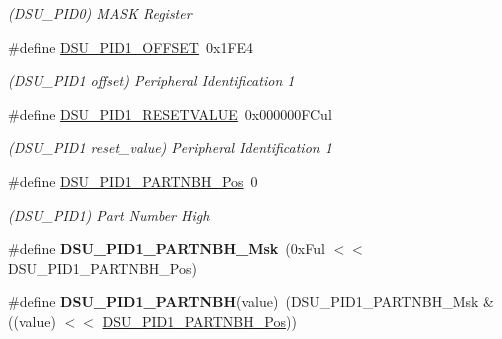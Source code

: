 \begin{DoxyCompactItemize}
\begin{DoxyCompactList}\small\item\em (D\+S\+U\+\_\+\+P\+I\+D0) M\+A\+S\+K Register \end{DoxyCompactList}\item 
\hypertarget{group___s_a_m_l21___d_s_u_ga1114e2adaab2fe61ed027acf899418de}{}\#define \hyperlink{group___s_a_m_l21___d_s_u_ga1114e2adaab2fe61ed027acf899418de}{D\+S\+U\+\_\+\+P\+I\+D1\+\_\+\+O\+F\+F\+S\+E\+T}~0x1\+F\+E4\label{group___s_a_m_l21___d_s_u_ga1114e2adaab2fe61ed027acf899418de}

\begin{DoxyCompactList}\small\item\em (D\+S\+U\+\_\+\+P\+I\+D1 offset) Peripheral Identification 1 \end{DoxyCompactList}\item 
\hypertarget{group___s_a_m_l21___d_s_u_ga257a59dab5e1bef2c233b637968f2786}{}\#define \hyperlink{group___s_a_m_l21___d_s_u_ga257a59dab5e1bef2c233b637968f2786}{D\+S\+U\+\_\+\+P\+I\+D1\+\_\+\+R\+E\+S\+E\+T\+V\+A\+L\+U\+E}~0x000000\+F\+Cul\label{group___s_a_m_l21___d_s_u_ga257a59dab5e1bef2c233b637968f2786}

\begin{DoxyCompactList}\small\item\em (D\+S\+U\+\_\+\+P\+I\+D1 reset\+\_\+value) Peripheral Identification 1 \end{DoxyCompactList}\item 
\hypertarget{group___s_a_m_l21___d_s_u_ga6dff7e586efe49ba2aa268119a27218d}{}\#define \hyperlink{group___s_a_m_l21___d_s_u_ga6dff7e586efe49ba2aa268119a27218d}{D\+S\+U\+\_\+\+P\+I\+D1\+\_\+\+P\+A\+R\+T\+N\+B\+H\+\_\+\+Pos}~0\label{group___s_a_m_l21___d_s_u_ga6dff7e586efe49ba2aa268119a27218d}

\begin{DoxyCompactList}\small\item\em (D\+S\+U\+\_\+\+P\+I\+D1) Part Number High \end{DoxyCompactList}\item 
\hypertarget{group___s_a_m_l21___d_s_u_ga03bce9efd137e37e8c749cdb2bdfe890}{}\#define {\bfseries D\+S\+U\+\_\+\+P\+I\+D1\+\_\+\+P\+A\+R\+T\+N\+B\+H\+\_\+\+Msk}~(0x\+Ful $<$$<$ D\+S\+U\+\_\+\+P\+I\+D1\+\_\+\+P\+A\+R\+T\+N\+B\+H\+\_\+\+Pos)\label{group___s_a_m_l21___d_s_u_ga03bce9efd137e37e8c749cdb2bdfe890}

\item 
\hypertarget{group___s_a_m_l21___d_s_u_ga61b0efd1cd16141a3808d1bad644a5aa}{}\#define {\bfseries D\+S\+U\+\_\+\+P\+I\+D1\+\_\+\+P\+A\+R\+T\+N\+B\+H}(value)~(D\+S\+U\+\_\+\+P\+I\+D1\+\_\+\+P\+A\+R\+T\+N\+B\+H\+\_\+\+Msk \& ((value) $<$$<$ \hyperlink{group___s_a_m_l21___d_s_u_ga6dff7e586efe49ba2aa268119a27218d}{D\+S\+U\+\_\+\+P\+I\+D1\+\_\+\+P\+A\+R\+T\+N\+B\+H\+\_\+\+Pos}))\label{group___s_a_m_l21___d_s_u_ga61b0efd1cd16141a3808d1bad644a5aa}


\end{DoxyCompactItemize}
